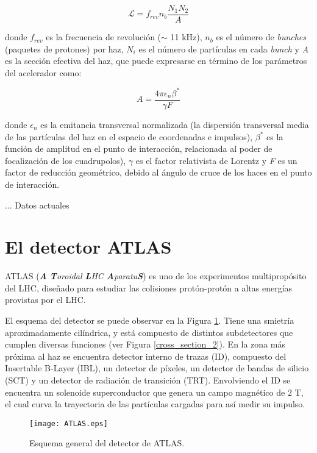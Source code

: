\begin{equation}
\mathcal{L}=f_{rev}n_{b}\frac{N_{1}N_{2}}{A}
\end{equation}

donde $f_{rev}$ es la frecuencia de revolución ($\sim$ 11 kHz), $n_{b}$ es el número de \textit{bunches} (paquetes de protones) por haz, $N_{i}$ es el número de partículas en cada \textit{bunch} y \textit{A} es la sección efectiva del haz, que puede expresarse en término de los parámetros del acelerador como:

\begin{equation}
A=\frac{4 \pi \epsilon_{n}\beta^{*}}{\gamma F}
\end{equation}

donde $\epsilon_{n}$ es la emitancia transversal normalizada (la dispersión transversal media de las partículas del  haz en el espacio de coordenadas e impulsos), $\beta^{*}$ es la función de amplitud en el punto de interacción, relacionada al poder de focalización de los cuadrupolos), $\gamma$ es el factor relativista de Lorentz y \textit{F} es un factor de reducción geométrico, debido al ángulo de cruce de los haces en el punto de interacción.

... Datos actuales

\section{El detector ATLAS}

ATLAS (\textit{\textbf{A} \textbf{T}oroidal \textbf{L}HC \textbf{A}paratu\textbf{S}})  \cite{PERF-2007-01} es uno de los experimentos multipropósito del LHC, diseñado para estudiar las colisiones protón-protón a altas energías provistas por el LHC.

El esquema del detector se puede observar en la Figura \ref{ATLAS}. Tiene una smietría aproximadamente cilíndrica, y está compuesto de distintos subdetectores que cumplen diversas funciones (ver Figura \ref{cross_section_2}). En la zona más próxima al haz se encuentra detector interno de trazas (ID), compuesto del Insertable B-Layer (IBL), un detector de píxeles, un detector de bandas de silicio (SCT) y un detector de radiación de transición (TRT). Envolviendo el ID se encuentra un solenoide superconductor que genera un campo magnético de $2$ T, el cual curva la trayectoria de las partículas cargadas para así medir su impulso.

\begin{figure}
\centering
\texttt{[image: ATLAS.eps]}
\caption{Esquema general del detector de ATLAS.}
\label{ATLAS}
\end{figure}

